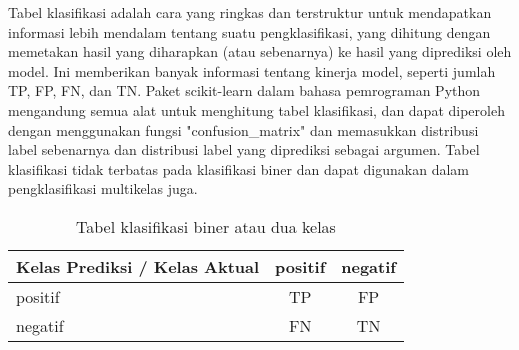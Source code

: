 Tabel klasifikasi adalah cara yang ringkas dan terstruktur untuk
mendapatkan informasi lebih mendalam tentang suatu pengklasifikasi, yang
dihitung dengan memetakan hasil yang diharapkan (atau sebenarnya) ke
hasil yang diprediksi oleh model. Ini memberikan banyak informasi
tentang kinerja model, seperti jumlah TP, FP, FN, dan TN. Paket
scikit-learn dalam bahasa pemrograman Python mengandung semua alat untuk
menghitung tabel klasifikasi, dan dapat diperoleh dengan menggunakan
fungsi "confusion\_matrix" dan memasukkan distribusi label sebenarnya
dan distribusi label yang diprediksi sebagai argumen. Tabel klasifikasi
tidak terbatas pada klasifikasi biner dan dapat digunakan dalam
pengklasifikasi multikelas juga.
\begin{table}[h!]
    \centering
    \begin{tabular}{ p{5cm} c c  }
        \hline
        Kelas Prediksi / Kelas Aktual & positif & negatif \\ [1ex]
        \hline
        positif & TP & FP \\
        negatif & FN & TN \\ [1ex]
        \hline
    \end{tabular}
    \caption{Tabel klasifikasi biner atau dua kelas}
    \label{tabel:1}
\end{table}

